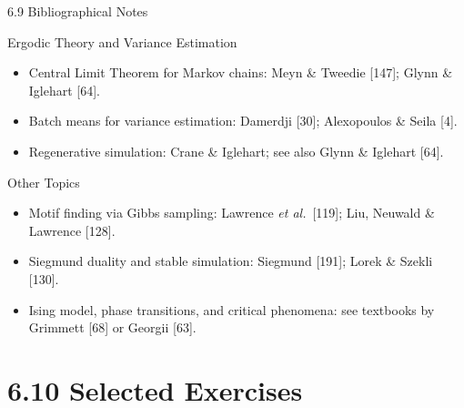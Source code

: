 \documentclass[aspectratio=169,10pt]{beamer}
\begin{document}
\begin{frame}[allowframebreaks]{6.9 Bibliographical Notes}
\begin{block}{Ergodic Theory and Variance Estimation}
\begin{itemize}
  \item Central Limit Theorem for Markov chains: Meyn \& Tweedie [147]; Glynn \& Iglehart [64].
  \item Batch means for variance estimation: Damerdji [30]; Alexopoulos \& Seila [4].
  \item Regenerative simulation: Crane \& Iglehart; see also Glynn \& Iglehart [64].
\end{itemize}
\end{block}

\begin{block}{Other Topics}
\begin{itemize}
  \item Motif finding via Gibbs sampling: Lawrence \emph{et al.}\ [119]; Liu, Neuwald \& Lawrence [128].
  \item Siegmund duality and stable simulation: Siegmund [191]; Lorek \& Szekli [130].
  \item Ising model, phase transitions, and critical phenomena: see textbooks by Grimmett [68] or Georgii [63].
\end{itemize}
\end{block}

\end{frame}

\section{6.10 Selected Exercises}
\end{document}
